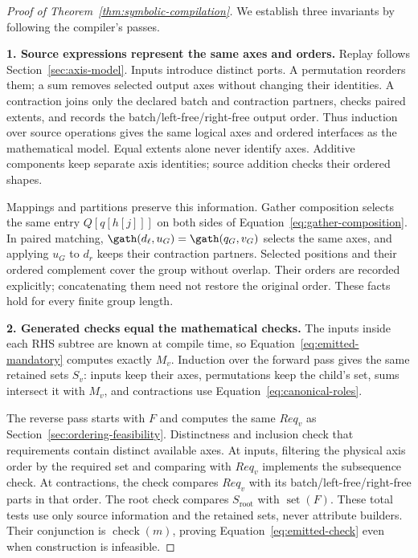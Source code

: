 \begin{proof}[Proof of Theorem~\ref{thm:symbolic-compilation}]
We establish three invariants by following the compiler's passes.

\noindent\textbf{1. Source expressions represent the same axes and orders.}
Replay follows Section~\ref{sec:axis-model}. Inputs introduce distinct
ports. A permutation reorders them; a sum removes selected output axes
without changing their identities. A contraction joins only the declared
batch and contraction partners, checks paired extents, and records the
batch/left-free/right-free output order. Thus induction over source
operations gives the same logical axes and ordered interfaces as the
mathematical model. Equal extents alone never identify axes. Additive
components keep separate axis identities; source addition checks their
ordered shapes.

Mappings and partitions preserve this information. Gather composition
selects the same entry $Q[q[h[j]]]$ on both sides of
Equation~\eqref{eq:gather-composition}. In paired matching,
$\gath(d_\ell,u_G)=\gath(q_G,v_G)$ selects the same axes, and applying
$u_G$ to $d_r$ keeps their contraction partners. Selected positions and
their ordered complement cover the group without overlap. Their orders
are recorded explicitly; concatenating them need not restore the original
order. These facts hold for every finite group length.

\noindent\textbf{2. Generated checks equal the mathematical checks.}
The inputs inside each RHS subtree are known at compile time, so
Equation~\eqref{eq:emitted-mandatory} computes exactly $M_v$. Induction over
the forward pass gives the same retained sets $S_v$: inputs keep their
axes, permutations keep the child's set, sums intersect it with $M_v$,
and contractions use Equation~\eqref{eq:canonical-roles}.

The reverse pass starts with $F$ and computes the same $Req_v$ as
Section~\ref{sec:ordering-feasibility}. Distinctness and inclusion check
that requirements contain distinct available axes. At inputs, filtering
the physical axis order by the required set and comparing with $Req_v$
implements the subsequence check. At contractions, the check compares
$Req_v$ with its batch/left-free/right-free parts in that order. The root
check compares $S_{\mathrm{root}}$ with $\operatorname{set}(F)$.
These total tests use only source information and the retained sets,
never attribute builders. Their conjunction is
$\operatorname{check}(m)$, proving Equation~\eqref{eq:emitted-check} even
when construction is infeasible.


\end{proof}
